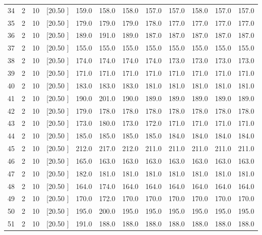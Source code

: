 \documentclass[12pt,a4paper]{article}
\begin{document}
\begin{center}
{\begin{tabular}{r r r r r r r r r r r r}
  34&  2& 10&[20.50     ]&   159.0&   158.0&   158.0&   157.0&   157.0&   158.0&   157.0&   157.0\\[-0.02in]
  35&  2& 10&[20.50     ]&   179.0&   179.0&   179.0&   178.0&   177.0&   177.0&   177.0&   177.0\\[-0.02in]
  36&  2& 10&[20.50     ]&   189.0&   191.0&   189.0&   187.0&   187.0&   187.0&   187.0&   187.0\\[-0.02in]
  37&  2& 10&[20.50     ]&   155.0&   155.0&   155.0&   155.0&   155.0&   155.0&   155.0&   155.0\\[-0.02in]
  38&  2& 10&[20.50     ]&   174.0&   174.0&   174.0&   174.0&   173.0&   173.0&   173.0&   173.0\\[-0.02in]
  39&  2& 10&[20.50     ]&   171.0&   171.0&   171.0&   171.0&   171.0&   171.0&   171.0&   171.0\\[-0.02in]
  40&  2& 10&[20.50     ]&   183.0&   183.0&   183.0&   181.0&   181.0&   181.0&   181.0&   181.0\\[-0.02in]
  41&  2& 10&[20.50     ]&   190.0&   201.0&   190.0&   189.0&   189.0&   189.0&   189.0&   189.0\\[-0.02in]
  42&  2& 10&[20.50     ]&   179.0&   178.0&   178.0&   178.0&   178.0&   178.0&   178.0&   178.0\\[-0.02in]
  43&  2& 10&[20.50     ]&   173.0&   180.0&   173.0&   172.0&   171.0&   171.0&   171.0&   171.0\\[-0.02in]
  44&  2& 10&[20.50     ]&   185.0&   185.0&   185.0&   185.0&   184.0&   184.0&   184.0&   184.0\\[-0.02in]
  45&  2& 10&[20.50     ]&   212.0&   217.0&   212.0&   211.0&   211.0&   211.0&   211.0&   211.0\\[-0.02in]
  46&  2& 10&[20.50     ]&   165.0&   163.0&   163.0&   163.0&   163.0&   163.0&   163.0&   163.0\\[-0.02in]
  47&  2& 10&[20.50     ]&   182.0&   181.0&   181.0&   181.0&   181.0&   181.0&   181.0&   181.0\\[-0.02in]
  48&  2& 10&[20.50     ]&   164.0&   174.0&   164.0&   164.0&   164.0&   164.0&   164.0&   164.0\\[-0.02in]
  49&  2& 10&[20.50     ]&   170.0&   172.0&   170.0&   170.0&   170.0&   170.0&   170.0&   170.0\\[-0.02in]
  50&  2& 10&[20.50     ]&   195.0&   200.0&   195.0&   195.0&   195.0&   195.0&   195.0&   195.0\\[-0.02in]
  51&  2& 10&[20.50     ]&   191.0&   188.0&   188.0&   188.0&   188.0&   188.0&   188.0&   188.0\\[-0.02in]

\end{tabular}}
\end{center}
\end{document}
